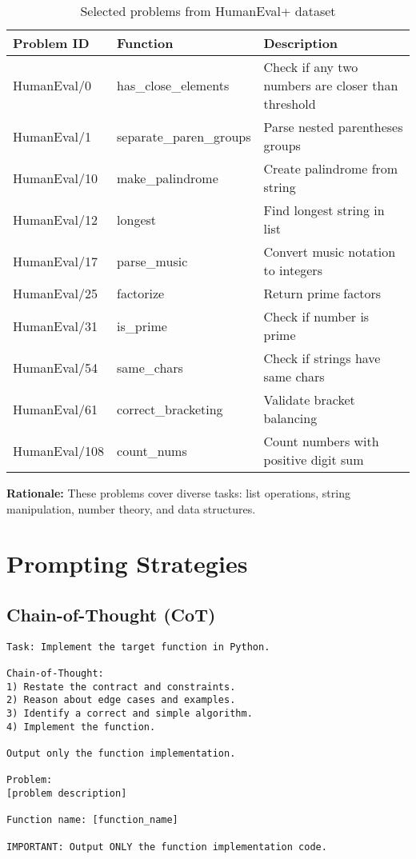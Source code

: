 \documentclass[11pt]{article}
\begin{document}
\begin{table}[h]
\centering
\small
\begin{tabular}{llp{7cm}}
\toprule
\textbf{Problem ID} & \textbf{Function} & \textbf{Description} \\
\midrule
HumanEval/0 & has\_close\_elements & Check if any two numbers are closer than threshold \\
HumanEval/1 & separate\_paren\_groups & Parse nested parentheses groups \\
HumanEval/10 & make\_palindrome & Create palindrome from string \\
HumanEval/12 & longest & Find longest string in list \\
HumanEval/17 & parse\_music & Convert music notation to integers \\
HumanEval/25 & factorize & Return prime factors \\
HumanEval/31 & is\_prime & Check if number is prime \\
HumanEval/54 & same\_chars & Check if strings have same chars \\
HumanEval/61 & correct\_bracketing & Validate bracket balancing \\
HumanEval/108 & count\_nums & Count numbers with positive digit sum \\
\bottomrule
\end{tabular}
\caption{Selected problems from HumanEval+ dataset}
\label{tab:problems}
\end{table}

\textbf{Rationale:} These problems cover diverse tasks: list operations, string manipulation, number theory, and data structures.

\section{Prompting Strategies}

\subsection{Chain-of-Thought (CoT)}

\begin{lstlisting}[caption={CoT Prompt Template}]
Task: Implement the target function in Python.

Chain-of-Thought:
1) Restate the contract and constraints.
2) Reason about edge cases and examples.
3) Identify a correct and simple algorithm.
4) Implement the function.

Output only the function implementation.

Problem:
[problem description]

Function name: [function_name]

IMPORTANT: Output ONLY the function implementation code.
\end{lstlisting}
\end{document}
